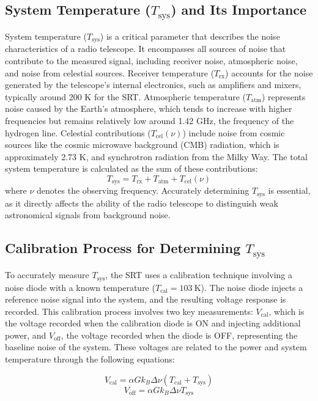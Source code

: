 \documentclass[linenumbers,twocolumn]{aastex631}
\begin{document}
\subsection{System Temperature ($T_{\text{sys}}$) and Its Importance}

System temperature ($T_{\text{sys}}$) is a critical parameter that describes the noise characteristics of a radio telescope. It encompasses all sources of noise that contribute to the measured signal, including receiver noise, atmospheric noise, and noise from celestial sources. Receiver temperature ($T_{\text{rx}}$) accounts for the noise generated by the telescope's internal electronics, such as amplifiers and mixers, typically around 200 K for the SRT. Atmospheric temperature ($T_{\text{atm}}$) represents noise caused by the Earth's atmosphere, which tends to increase with higher frequencies but remains relatively low around 1.42 GHz, the frequency of the hydrogen line. Celestial contributions ($T_{\text{cel}}(\nu)$) include noise from cosmic sources like the cosmic microwave background (CMB) radiation, which is approximately 2.73 K, and synchrotron radiation from the Milky Way. The total system temperature is calculated as the sum of these contributions:
\[
T_{\text{sys}} = T_{\text{rx}} + T_{\text{atm}} + T_{\text{cel}}(\nu)
\]
where $\nu$ denotes the observing frequency. Accurately determining $T_{\text{sys}}$ is essential, as it directly affects the ability of the radio telescope to distinguish weak astronomical signals from background noise.

 \subsection{Calibration Process for Determining $T_{\text{sys}}$}

To accurately measure $T_{\text{sys}}$, the SRT uses a calibration technique involving a noise diode with a known temperature ($T_{\text{cal}} = 103 \ \text{K}$). The noise diode injects a reference noise signal into the system, and the resulting voltage response is recorded. This calibration process involves two key measurements: $V_{\text{cal}}$, which is the voltage recorded when the calibration diode is ON and injecting additional power, and $V_{\text{off}}$, the voltage recorded when the diode is OFF, representing the baseline noise of the system. These voltages are related to the power and system temperature through the following equations:

\[
V_{\text{cal}} = \alpha G k_{B} \Delta \nu (T_{\text{cal}} + T_{\text{sys}})
\]
\[
V_{\text{off}} = \alpha G k_{B} \Delta \nu T_{\text{sys}}
\]
\end{document}
